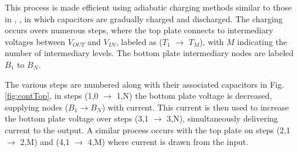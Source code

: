 \documentclass[conference]{IEEEtran}
\begin{document}
	This process is made efficient using adiabatic charging methods similar to those in \cite{svensson1994}, \cite{Butzen2016}, in which capacitors are gradually charged and discharged. The charging occurs overs numerous steps, where the top plate connects to intermediary voltages between $V_{OUT}$ and $V_{IN}$, labeled as ($T_1$ $\rightarrow$ $T_M$), with $M$ indicating the number of intermediary levels. The bottom plate intermediary nodes are labeled $B_1$ to $B_N$.
	
	The various steps are numbered along with their associated capacitors in Fig. \ref{fig:contTop}, in steps (1,0 $\rightarrow$ 1,N) the bottom plate voltage is decreased, supplying nodes ($B_1 \rightarrow B_N$) with current. This current is then used to increase the bottom plate voltage over steps (3,1 $\rightarrow$ 3,N), simultaneously delivering current to the output. A similar process occurs with the top plate on steps (2,1 $\rightarrow$ 2,M) and (4,1 $\rightarrow$ 4,M) where current is drawn from the input.
	
\end{document}
